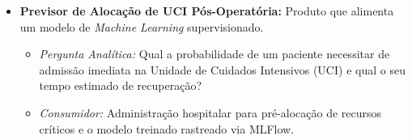 \begin{itemize}
	\item \textbf{Previsor de Alocação de UCI Pós-Operatória:} Produto que alimenta um modelo de \textit{Machine Learning} supervisionado.
	\begin{itemize}
		\item \textit{Pergunta Analítica:} Qual a probabilidade de um paciente necessitar de admissão imediata na Unidade de Cuidados Intensivos (UCI) e qual o seu tempo estimado de recuperação? 
		\item \textit{Consumidor:} Administração hospitalar para pré-alocação de recursos críticos e o modelo treinado rastreado via MLFlow.
	\end{itemize}
\end{itemize}